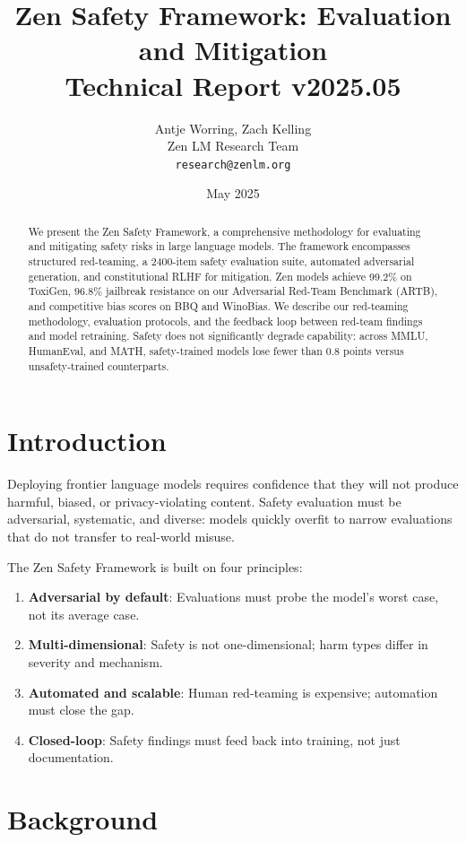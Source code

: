 \documentclass[11pt,a4paper]{article}
\title{\textbf{Zen Safety Framework: Evaluation and Mitigation}\\
\large Technical Report v2025.05}
\author{Antje Worring, Zach Kelling \\ Zen LM Research Team\\
\texttt{research@zenlm.org}}
\date{May 2025}
\begin{document}
\maketitle

\begin{abstract}
We present the Zen Safety Framework, a comprehensive methodology for evaluating and
mitigating safety risks in large language models. The framework encompasses structured
red-teaming, a 2400-item safety evaluation suite, automated adversarial generation,
and constitutional RLHF for mitigation. Zen models achieve 99.2\% on ToxiGen,
96.8\% jailbreak resistance on our Adversarial Red-Team Benchmark (ARTB), and
competitive bias scores on BBQ and WinoBias. We describe our red-teaming methodology,
evaluation protocols, and the feedback loop between red-team findings and model
retraining. Safety does not significantly degrade capability: across MMLU, HumanEval,
and MATH, safety-trained models lose fewer than 0.8 points versus unsafety-trained
counterparts.
\end{abstract}

\section{Introduction}

Deploying frontier language models requires confidence that they will not produce
harmful, biased, or privacy-violating content. Safety evaluation must be adversarial,
systematic, and diverse: models quickly overfit to narrow evaluations that do not
transfer to real-world misuse.

The Zen Safety Framework is built on four principles:
\begin{enumerate}
  \item \textbf{Adversarial by default}: Evaluations must probe the model's worst case, not its average case.
  \item \textbf{Multi-dimensional}: Safety is not one-dimensional; harm types differ in severity and mechanism.
  \item \textbf{Automated and scalable}: Human red-teaming is expensive; automation must close the gap.
  \item \textbf{Closed-loop}: Safety findings must feed back into training, not just documentation.
\end{enumerate}

\section{Background}
\end{document}
